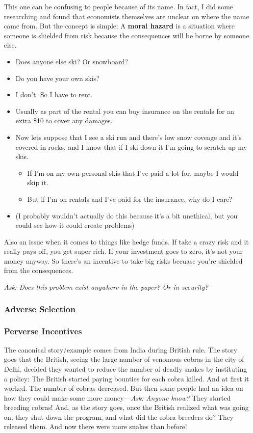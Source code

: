 \documentclass[11pt]{article}
\begin{document}
This one can be confusing to people because of its name. In fact, I did some researching and found that economists themselves are unclear on where the name came from. But the concept is simple: A {\bf moral hazard} is a situation where someone is shielded from risk because the consequences will be borne by someone else.
\begin{itemize}
    \item Does anyone else ski? Or snowboard? 
    \item Do you have your own skis?
    \item I don't. So I have to rent. 
    \item Usually as part of the rental you can buy insurance on the rentals for an extra \$10 to cover any damages. 
    \item Now lets suppose that I see a ski run and there's low snow coveage and it's covered in rocks, and I know that if I ski down it I'm going to scratch up my skis. 
    \begin{itemize}
        \item If I'm on my own personal skis that I've paid a lot for, maybe I would skip it. 
        \item But if I'm on rentals and I've paid for the insurance, why do I care?
    \end{itemize}
    \item (I probably wouldn't actually do this because it's a bit unethical, but you could see how it could create problems)
\end{itemize}

Also an issue when it comes to things like hedge funds. If take a crazy risk and it really pays off, you get super rich. If your investment goes to zero, it's not your money anyway. So there's an incentive to take big risks becuase you're shielded from the consequences.

{\it Ask: Does this problem exist anywhere in the paper? Or in security?}

\subsubsection{Adverse Selection}

\subsubsection{Perverse Incentives}

The canonical story/example comes from India during British rule. The story goes that the British, seeing the large number of venomous cobras in the city of Delhi, decided they wanted to reduce the number of deadly snakes by instituting a policy: The British started paying bounties for each cobra killed. And at first it worked. The number of cobras decreased. But then some people had an idea on how they could make some more money---{\it Ask: Anyone know?} They started breeding cobras! And, as the story goes, once the British realized what was going on, they shut down the program, and what did the cobra breeders do? They released them. And now there were more snakes than before!
\end{document}
